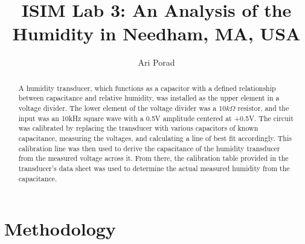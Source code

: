 \documentclass[11pt]{article}
\begin{document}
\title{ISIM Lab 3: An Analysis of the Humidity in Needham, MA, USA}
\author{Ari Porad}
\maketitle %

\begin{abstract}
    A humidity transducer, which functions as a capacitor with a defined relationship between capacitance and relative humidity, was installed as the upper element in a voltage divider. The lower element of the voltage divider was a $10k\Omega$ resistor, and the input was an 10kHz square wave with a 0.5V amplitude centered at +0.5V. The circuit was calibrated by replacing the transducer with various capacitors of known capacitance, measuring the voltages, and calculating a line of best fit accordingly. This calibration line was then used to derive the capacitance of the humidity transducer from the measured voltage across it. From there, the calibration table provided in the transducer's data sheet was used to determine the actual measured humidity from the capacitance.
\end{abstract}

\section{Methodology}
\end{document}
